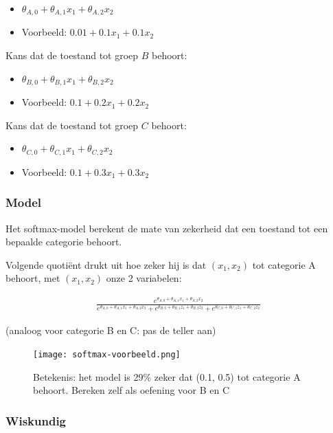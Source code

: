 \documentclass{article}
\begin{document}
\begin{itemize}
    \item $\theta_{A,0} + \theta_{A,1}x_1 + \theta_{A,2}x_2$
    \item Voorbeeld: $0.01 + 0.1x_1 + 0.1x_2$
\end{itemize}

Kans dat de toestand tot groep $B$ behoort:

\begin{itemize}
    \item $\theta_{B,0} + \theta_{B,1}x_1 + \theta_{B,2}x_2$
    \item Voorbeeld: $0.1 + 0.2x_1 + 0.2x_2$
\end{itemize}

Kans dat de toestand tot groep $C$ behoort:

\begin{itemize}
    \item $\theta_{C,0} + \theta_{C,1}x_1 + \theta_{C,2}x_2$
    \item Voorbeeld: $0.1 + 0.3x_1 + 0.3x_2$
\end{itemize}

\subsubsection{Model}

Het softmax-model berekent de mate van zekerheid dat een toestand tot een bepaalde categorie behoort.

Volgende quotiënt drukt uit hoe zeker hij is dat $(x_1, x_2)$ tot categorie A behoort, met $(x_1, x_2)$ onze 2 variabelen:

\begin{align*}
    \frac{e^{\theta_{A,0} + \theta_{A,1}x_1 + \theta_{A,2}x_2}}{e^{\theta_{A,0} + \theta_{A,1}x_1 + \theta_{A,2}x_2} + e^{\theta_{B,0} + \theta_{B,1}z_1 + \theta_{B,2}z_2} + e^{\theta_{C,0} + \theta_{C,1}z_1 + \theta_{C,2}z_2} }
\end{align*}

(analoog voor categorie B en C: pas de teller aan)

\begin{figure}[H]
    \centering
    \texttt{[image: softmax-voorbeeld.png]}
    \caption{Betekenis: het model is 29\% zeker dat (0.1, 0.5) tot categorie A behoort. Bereken zelf als oefening voor B en C}
\end{figure}

\subsubsection{Wiskundig}
\end{document}
